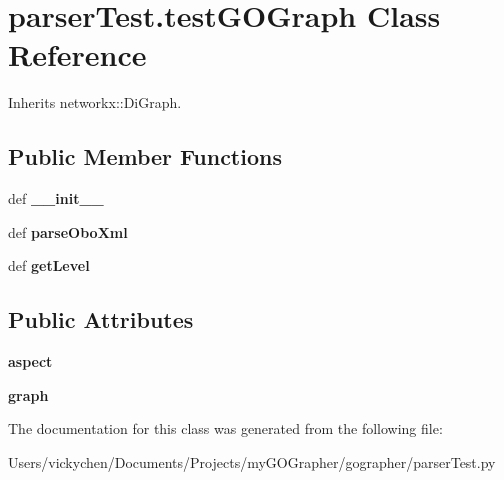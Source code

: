 \hypertarget{classparser_test_1_1test_g_o_graph}{
\section{parserTest.testGOGraph Class Reference}
\label{classparser_test_1_1test_g_o_graph}
}


Inherits networkx::DiGraph.

\subsection*{Public Member Functions}
\begin{DoxyCompactItemize}
\item 
\hypertarget{classparser_test_1_1test_g_o_graph_af91a178d37bd1db3dfeaf4e500426b0c}{
def {\bfseries \_\-\_\-init\_\-\_\-}}
\label{classparser_test_1_1test_g_o_graph_af91a178d37bd1db3dfeaf4e500426b0c}

\item 
\hypertarget{classparser_test_1_1test_g_o_graph_af0982fd7e2c63ce8f0e5d97d2d14d16d}{
def {\bfseries parseOboXml}}
\label{classparser_test_1_1test_g_o_graph_af0982fd7e2c63ce8f0e5d97d2d14d16d}

\item 
\hypertarget{classparser_test_1_1test_g_o_graph_a782852fc044545b8ad591ce34987d956}{
def {\bfseries getLevel}}
\label{classparser_test_1_1test_g_o_graph_a782852fc044545b8ad591ce34987d956}

\end{DoxyCompactItemize}
\subsection*{Public Attributes}
\begin{DoxyCompactItemize}
\item 
\hypertarget{classparser_test_1_1test_g_o_graph_a3733a7689ecb5dbfe7bc59026c2adebd}{
{\bfseries aspect}}
\label{classparser_test_1_1test_g_o_graph_a3733a7689ecb5dbfe7bc59026c2adebd}

\item 
\hypertarget{classparser_test_1_1test_g_o_graph_a3f64bb6d5fedd7c78c2b1b8b9c3f8ac1}{
{\bfseries graph}}
\label{classparser_test_1_1test_g_o_graph_a3f64bb6d5fedd7c78c2b1b8b9c3f8ac1}

\end{DoxyCompactItemize}


The documentation for this class was generated from the following file:\begin{DoxyCompactItemize}
\item 
Users/vickychen/Documents/Projects/myGOGrapher/gographer/parserTest.py\end{DoxyCompactItemize}
